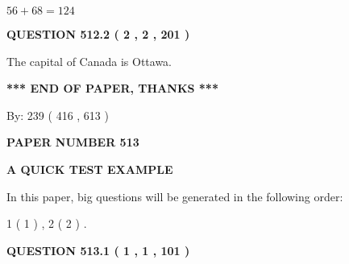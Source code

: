 \documentclass[12pt]{article}
\begin{document}
$ %
56 +  %
68=   %
124$
 
 
  
\vspace{0.2in}
  
{\textbf{\Large{QUESTION
512.2 
 ( 2 , 2 , 201 )
}}}
  
  
 
 
\noindent{}
 
 
The capital of Canada is Ottawa.
 
 
 
 
   
   
 \vspace{0.2in}
 
   
   
   
   
\vspace{1.0in} 
{\textbf{\large{ *** END OF PAPER, THANKS *** }}} 
   
   
\hspace{1.0in} By: 
 239 ( 416 ,  613 )
   
   
   
   
\newpage 
\setcounter{page}{ 
   513001 } 
   
   
   
   
 {\textbf{ \Large{ PAPER NUMBER  513  }}}
   
   
\vspace{0.2in}
   
   
   
   
   
   
 \vspace{0.2in}
{\LARGE {\textbf{ A QUICK TEST EXAMPLE}}}
   
   
   
\vspace{0.2in}
   
In this paper, big questions will be generated in the following order: 
   
   
   1 ( 1 )
 ,
   2 ( 2 )
 .
  
\vspace{0.2in}
  
{\textbf{\Large{QUESTION
513.1 
 ( 1 , 1 , 101 )
}}}
  
  
 
 
\noindent{}
\end{document}
